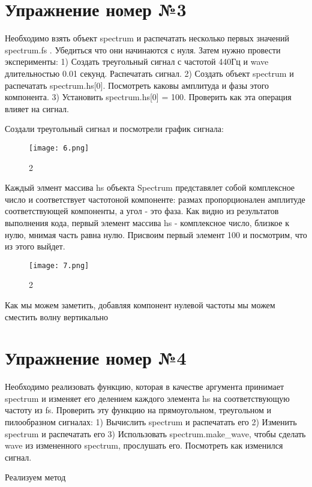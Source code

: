 \documentclass[10pt,a4paper,oneside]{article}
\begin{document}
\section{Упражнение номер №3}
Необходимо взять объект spectrum и распечатать несколько первых значений spectrum.fs . Убедиться что они начинаются с нуля. Затем нужно провести эксперименты:
1) Создать треугольный сигнал с частотой 440Гц и wave длительностью 0.01 секунд. Распечатать сигнал.
2) Создать объект spectrum и распечатать spectrum.hs[0]. Посмотреть каковы амплитуда и фазы этого компонента.
3) Установить spectrum.hs[0] = 100. Проверить как эта операция влияет на сигнал. 

Создали треугольный сигнал и посмотрели график сигнала:

\begin{figure}[H]
        \centering
        \texttt{[image: 6.png]}
        \caption{2}
        \label{fig:first}
\end{figure}

Каждый элмент массива hs объекта Spectrum представялет собой комплексное число и соответствует частотоной компоненте: размах пропорционален амплитуде соответствующей компоненты, а угол - это фаза. Как видно из результатов выполнения кода, первый элемент массива hs - комплексное число, близкое к нулю, мнимая часть равна нулю. Присвоим первый элемент 100 и посмотрим, что из этого выйдет.

\begin{figure}[H]
        \centering
        \texttt{[image: 7.png]}
        \caption{2}
        \label{fig:first}
\end{figure}

Как мы можем заметить, добавляя компонент нулевой частоты мы можем сместить волну вертикально

\section{Упражнение номер №4}
Необходимо реализовать функцию, которая в качестве аргумента принимает spectrum и изменяет его делением каждого элемента hs на соответствующую частоту из fs. Проверить эту функцию на прямоугольном, треугольном и пилообразном сигналах:
1) Вычислить spectrum и распечатать его
2) Изменить spectrum и распечатать его
3) Использовать spectrum.make_wave, чтобы сделать wave из измененного spectrum, прослушать его. Посмотреть как изменился сигнал.

Реализуем метод
\end{document}
